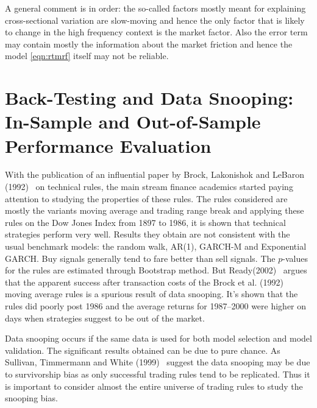 A general comment is in order: the so-called factors mostly meant for explaining cross-sectional variation are slow-moving and hence the only factor that is likely to change in the high frequency context is the market factor. Also the error term may contain mostly the information about the market friction and hence the model \eqref{eqn:rtmrf} itself may not be reliable.



\section{Back-Testing and Data Snooping:  In-Sample and Out-of-Sample Performance Evaluation}


With the publication of an influential paper by Brock, Lakonishok and LeBaron (1992)~\cite{BLL} on technical rules, the main stream finance academics started paying attention to studying the properties of these rules. The rules considered are mostly the variants moving average and trading range break and applying these rules on the Dow Jones Index from 1897 to 1986, it is shown that technical strategies perform very well. Results they obtain are not consistent with the usual benchmark models: the random walk, AR(1), GARCH-M and Exponential GARCH. Buy signals generally tend to fare better than sell signals. The $p$-values for the rules are estimated through Bootstrap method. But Ready(2002)~\cite{ready} argues that the apparent success after transaction costs of the Brock et al. (1992)~\cite{BLL} moving average rules is a spurious result of data snooping. It's shown that the rules did poorly post 1986 and the average returns for 1987--2000 were higher on days when strategies suggest to be out of the market.


Data snooping occurs if the same data is used for both model selection and model validation. The significant results obtained can be due to pure chance. As Sullivan, Timmermann and White (1999)~\cite{sullivan1999data} suggest the data snooping may be due to survivorship bias as only successful trading rules tend to be replicated. Thus it is important to consider almost the entire universe of trading rules to study the snooping bias.


